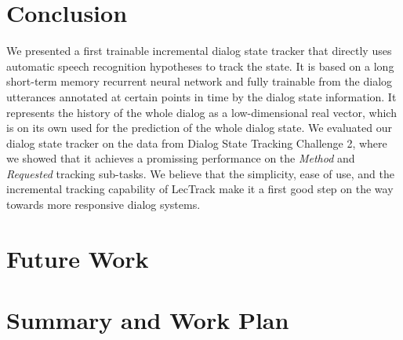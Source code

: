 \documentclass[10pt,twocolumn]{article}
\begin{document}
\section{Conclusion}
\label{sec:conclusion}
We presented a first trainable incremental dialog state tracker that directly uses automatic speech recognition hypotheses to track the state. It is based on a long short-term memory recurrent neural network and fully trainable from the dialog utterances annotated at certain points in time by the dialog state information. It represents the history of the whole dialog as a low-dimensional real vector, which is on its own used for the prediction of the whole dialog state. We evaluated our dialog state tracker on the data from Dialog State Tracking Challenge 2, where we showed that it achieves a promissing performance on the \emph{Method} and \emph{Requested} tracking sub-tasks. We believe that the simplicity, ease of use, and the incremental tracking capability of LecTrack make it a first good step on the way towards more responsive dialog systems.




\section{Future Work}


\section{Summary and Work Plan}





\end{document}
